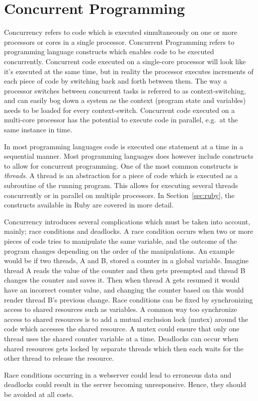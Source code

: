 \section{Concurrent Programming} %
\label{sec:concurrent}
Concurrency refers to code which is executed simultaneously on one or more
processors or cores in a single processor. Concurrent Programming refers to
programming language constructs which enables code to be executed concurrently.
Concurrent code executed on a single-core processor will look like it's executed
at the same time, but in reality the processor executes increments of each piece
of code by switching back and forth between them. The way a processor switches
between concurrent tasks is referred to as context-switching, and can easily bog
down a system as the context (program state and variables) needs to be loaded
for every context-switch.  Concurrent code executed on a multi-core processor
has the potential to execute code in parallel, e.g.\ at the same instance in
time.

In most programming languages code is executed one statement at a time in a
sequential manner. Most programming languages does however include constructs
to allow for concurrent programming.  One of the most common constructs is
\textit{threads}. A thread is an abstraction for a piece of code which is
executed as a subroutine of the running program. This allows for executing
several threads concurrently or in parallel on multiple processors.  In
Section~\ref{sec:ruby}, the constructs available in Ruby are covered in more
detail.

Concurrency introduces several complications which must be taken into account,
mainly; race conditions and deadlocks. A race condition occurs when two or more
pieces of code tries to manipulate the same variable, and the outcome of the
program changes depending on the order of the manipulations. An example would be
if two threads, A and B, stored a counter in a global variable. Imagine thread A 
reads the value of the counter and then gets preempted and thread B changes
the counter and saves it. Then when thread A gets resumed it would have an
incorrect counter value, and changing the counter based on this would render
thread B's previous change. Race conditions can be fixed by synchronizing access
to shared resources such as variables. A common way too synchronize access to
shared resources is to add a mutual exclusion lock (mutex) around the code which
accesses the shared resource. A mutex could ensure that only one thread uses the
shared counter variable at a time. Deadlocks can occur when shared resources gets
locked by separate threads which then each waits for the other thread to
release the resource.

Race conditions occurring in a webserver could lead to erroneous data and
deadlocks could result in the server becoming unresponsive. Hence, they should
be avoided at all costs.

